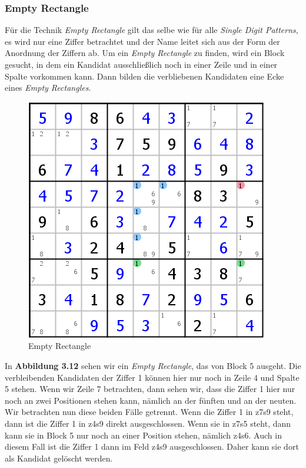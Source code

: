 \newpage
\subsubsection{Empty Rectangle}
Für die Technik \textit{Empty Rectangle} gilt das selbe wie für alle \textit{Single Digit Patterns}, es wird nur eine Ziffer betrachtet und der Name leitet sich aus der Form der Anordnung der Ziffern ab. Um ein \textit{Empty Rectangle} zu finden, wird ein Block gesucht, in dem ein Kandidat ausschließlich noch in einer Zeile und in einer Spalte vorkommen kann. Dann bilden die verbliebenen Kandidaten eine Ecke eines \textit{Empty Rectangles}.

\begin{figure}[h]
\begin{center}
\includegraphics{./img/empty_rectangle.png}
\caption{Empty Rectangle}
\end{center}
\end{figure}

In \textbf{Abbildung 3.12} sehen wir ein \textit{Empty Rectangle}, das von Block 5 ausgeht. Die verbleibenden Kandidaten der Ziffer 1 können hier nur noch in Zeile 4 und Spalte 5 stehen. Wenn wir Zeile 7 betrachten, dann sehen wir, dass die Ziffer 1 hier nur noch an zwei Positionen stehen kann, nämlich an der fünften und an der neuten. Wir betrachten nun diese beiden Fälle getrennt. Wenn die Ziffer 1 in z7s9 steht, dann ist die Ziffer 1 in z4s9 direkt ausgeschlossen. Wenn sie in z7s5 steht, dann kann sie in Block 5 nur noch an einer Position stehen, nämlich z4s6. Auch in diesem Fall ist die Ziffer 1 dann im Feld z4s9 ausgeschlossen. Daher kann sie dort als Kandidat gelöscht werden.